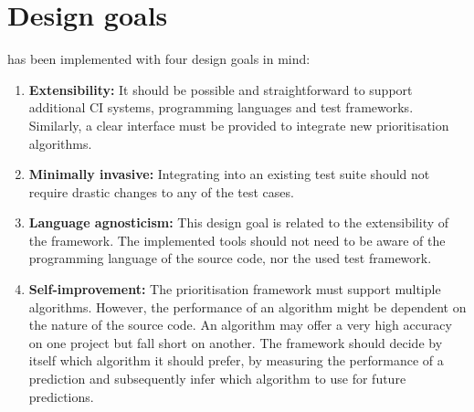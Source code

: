 
\section{Design goals}
\velocity{} has been implemented with four design goals in mind:
\begin{enumerate}
	\item \textbf{Extensibility:} It should be possible and straightforward to support additional CI systems, programming languages and test frameworks. Similarly, a clear interface must be provided to integrate new prioritisation algorithms.
	
	\item \textbf{Minimally invasive:} Integrating \velocity{} into an existing test suite should not require drastic changes to any of the test cases.
	
	\item \textbf{Language agnosticism:} This design goal is related to the extensibility of the framework. The implemented tools should not need to be aware of the programming language of the source code, nor the used test framework.
	
	\item \textbf{Self-improvement:} The prioritisation framework must support multiple algorithms. However, the performance of an algorithm might be dependent on the nature of the source code. An algorithm may offer a very high accuracy on one project but fall short on another. The framework should decide by itself which algorithm it should prefer, by measuring the performance of a prediction and subsequently infer which algorithm to use for future predictions.
\end{enumerate}
